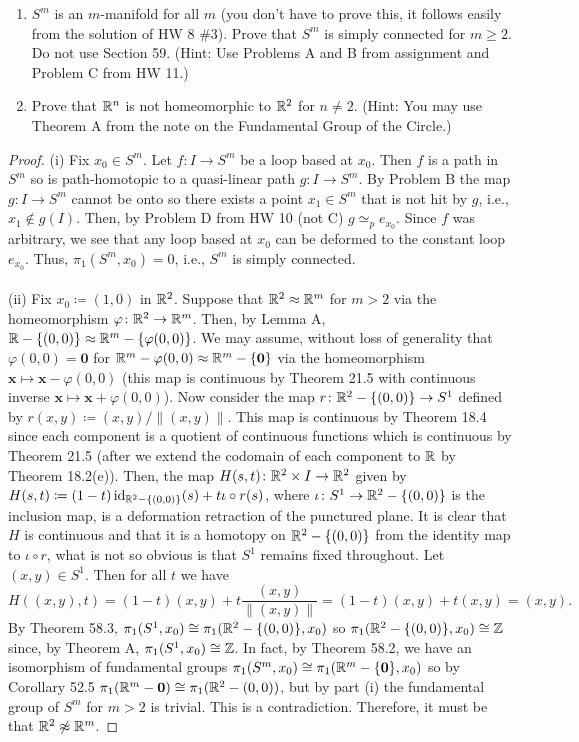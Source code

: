 \newpage
\begin{problem}[C]
\begin{enumerate}[label=(\roman*)]
\item $S^m$ is an $m$-manifold for all $m$ (you don't have to prove this,
  it follows easily from the solution of HW 8 \#3). Prove that $S^m$ is
  simply connected for $m\geq 2$. Do not use Section 59. (Hint: Use
  Problems A and B from assignment and Problem C from HW 11.)
\item Prove that $\mathbb{R}^n$ is not homeomorphic to $\mathbb{R}^2$ for $n\neq
  2$. (Hint: You may use Theorem A from the note on the Fundamental Group
  of the Circle.)
\end{enumerate}
\end{problem}
\begin{proof}
(i) Fix $x_0\in S^m$. Let $f\colon I\to S^m$ be a loop based at $x_0$. Then
$f$ is a path in $S^m$ so is path-homotopic to a quasi-linear path $g\colon
I\to S^m$. By Problem B the map $g\colon I\to S^m$ cannot be onto so there
exists a point $x_1\in S^m$ that is not hit by $g$, i.e., $x_1\notin
g(I)$. Then, by Problem D from HW 10 (not C) $g\simeq_p e_{x_0}$. Since $f$
was arbitrary, we see that any loop based at $x_0$ can be deformed to the
constant loop $e_{x_0}$. Thus, $\pi_1(S^m,x_0)=0$, i.e., $S^m$ is simply
connected.
\\\\
(ii) Fix $x_0\coloneqq(1,0)$ in $\mathbb{R}^2$. Suppose that $\mathbb{R}^2\approx\mathbb{R}^m$
for $m>2$ via the homeomorphism $\varphi\colon\mathbb{R}^2\to\mathbb{R}^m$. Then, by
Lemma A, $\mathbb{R}-\{(0,0)\}\approx\mathbb{R}^m-\{\varphi(0,0)\}$. We may assume,
without loss of generality that $\varphi(0,0)=\mathbf{0}$ for
$\mathbb{R}^m-{\varphi(0,0)}\approx\mathbb{R}^m-\{\mathbf{0}\}$ via the homeomorphism
$\mathbf{x}\mapsto\mathbf{x}-\varphi(0,0)$ (this map is continuous by
Theorem 21.5 with continuous inverse
$\mathbf{x}\mapsto\mathbf{x}+\varphi(0,0)$). Now consider the map
$r\colon\mathbb{R}^2-\{(0,0)\}\to S^1$ defined by $r(x,y)\coloneqq
(x,y)/\|(x,y)\|$. This map is continuous by Theorem 18.4 since each
component is a quotient of continuous functions which is continuous by
Theorem 21.5 (after we extend the codomain of each component to $\mathbb{R}$ by
Theorem 18.2(e)). Then, the map $H(s,t)\colon \mathbb{R}^2\times I\to\mathbb{R}^2$ given
by $H(s,t)\coloneqq (1-t)\operatorname{id}_{\mathbb{R}^2-\{(0,0)\}}(s)+t \iota\circ r(s)$, where
$\iota\colon S^1\to\mathbb{R}^2-\{(0,0)\}$ is the inclusion map, is a deformation
retraction of the punctured plane. It is clear that $H$ is continuous and
that it is a homotopy on $\mathbb{R}^2-\{(0,0)\}$ from the identity map to
$\iota\circ r$, what is not so obvious is that $S^1$ remains fixed
throughout. Let $(x,y)\in S^1$. Then for all $t$ we have
\[
H((x,y),t)=(1-t)(x,y)+t\frac{(x,y)}{\|(x,y)\|}=(1-t)(x,y)+t(x,y)=(x,y).
\]
By Theorem 58.3, $\pi_1(S^1,x_0)\cong\pi_1(\mathbb{R}^2-\{(0,0)\},x_0)$ so
$\pi_1(\mathbb{R}^2-\{(0,0)\},x_0)\cong\mathbb{Z}$ since, by Theorem A,
$\pi_1(S^1,x_0)\cong\mathbb{Z}$. In fact, by Theorem 58.2, we have an isomorphism
of fundamental groups $\pi_1(S^m,x_0)\cong\pi_1(\mathbb{R}^m-\{\mathbf{0}\},x_0)$
so by Corollary 52.5 $\pi_1(\mathbb{R}^m-{\mathbf{0}})\cong\pi_1(\mathbb{R}^2-{(0,0)})$,
but by part (i) the fundamental group of $S^m$ for $m>2$ is trivial. This
is a contradiction. Therefore, it must be that $\mathbb{R}^2\not\approx\mathbb{R}^m$.
\end{proof}

